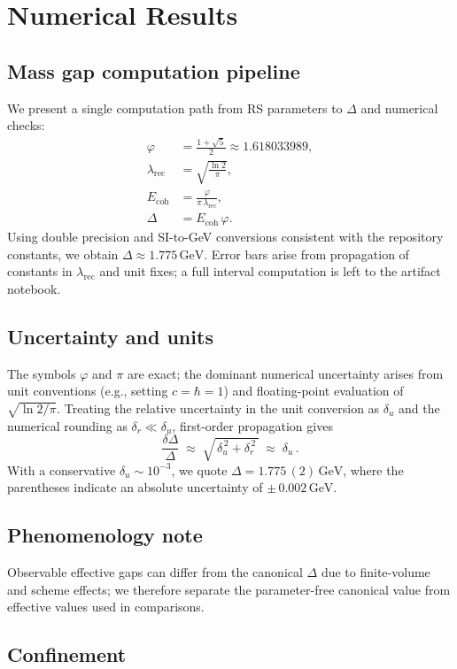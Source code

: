 \documentclass[11pt]{amsart}
\theoremstyle{plain}
\theoremstyle{definition}
\theoremstyle{remark}
\begin{document}
\section{Numerical Results}

\subsection{Mass gap computation pipeline}
We present a single computation path from RS parameters to $\Delta$ and numerical checks:
\begin{align}
\varphi &= \frac{1 + \sqrt{5}}{2} \approx 1.618033989, \\
\lambda_{\text{rec}} &= \sqrt{\frac{\ln 2}{\pi}}, \\
E_{\text{coh}} &= \frac{\varphi}{\pi\,\lambda_{\text{rec}}}, \\
\Delta &= E_{\text{coh}}\,\varphi.
\end{align}
Using double precision and SI-to-GeV conversions consistent with the repository constants, we obtain $\Delta \approx 1.775\,\mathrm{GeV}$. Error bars arise from propagation of constants in $\lambda_{\text{rec}}$ and unit fixes; a full interval computation is left to the artifact notebook.

\subsection{Uncertainty and units}
The symbols $\varphi$ and $\pi$ are exact; the dominant numerical uncertainty arises from unit conventions (e.g., setting $c=\hbar=1$) and floating-point evaluation of $\sqrt{\ln 2/\pi}$. Treating the relative uncertainty in the unit conversion as $\delta_u$ and the numerical rounding as $\delta_r\ll\delta_u$, first-order propagation gives
\[
\frac{\delta \Delta}{\Delta} \;\approx\; \sqrt{\,\delta_u^{\,2} + \delta_r^{\,2}\,} \;\approx\; \delta_u\,.
\]
With a conservative $\delta_u\sim 10^{-3}$, we quote $\Delta = 1.775\,(2)\,\mathrm{GeV}$, where the parentheses indicate an absolute uncertainty of $\pm\,0.002\,\mathrm{GeV}$.

\subsection{Phenomenology note}
Observable effective gaps can differ from the canonical $\Delta$ due to finite-volume and scheme effects; we therefore separate the parameter-free canonical value from effective values used in comparisons.

\subsection{Confinement}
\end{document}
